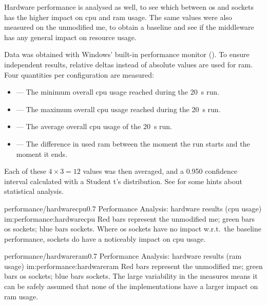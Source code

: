 

Hardware performance is analysed as well, to see which between \gls{os} and  sockets has the higher impact on \gls{cpu} and \gls{ram} usage. The same values were also measured on the unmodified \gls{me}, to obtain a baseline and see if the \gls{middleware} has any general impact on resource usage.

Data was obtained with Windows' built-in performance monitor (). To ensure independent results, relative deltas instead of absolute values are used for \gls{ram}. Four quantities per configuration are measured:

\begin{itemize}
	\item {} --- The minimum overall \gls{cpu} usage reached during the \SI{20}{\second} run.
	\item {} --- The maximum overall \gls{cpu} usage reached during the \SI{20}{\second} run.
	\item {} --- The average overall \gls{cpu} usage of the \SI{20}{\second} run.
	\item {} --- The difference in used \gls{ram} between the moment the run starts and the moment it ends.
\end{itemize}

\FLOATnoindent Each of these $4\times3=12$ values was then averaged, and a \num{0,950} confidence interval calculated with a Student t's distribution. See  for some hints about statistical analysis.

\begin{image}
	{performance/hardwarecpu}{0.7}
	{Performance Analysis: hardware results (\gls{cpu} usage)}
	{im:performance:hardwarecpu}
	{}
	{Red bars represent the unmodified \gls{me}; green bars \gls{os} sockets; blue bars  sockets. Where \gls{os} sockets have no impact w.r.t.\ the baseline performance,  sockets do have a noticeably impact on \gls{cpu} usage.}
\end{image}

\begin{image}
	{performance/hardwareram}{0.7}
	{Performance Analysis: hardware results (\gls{ram} usage)}
	{im:performance:hardwareram}
	{}
	{Red bars represent the unmodified \gls{me}; green bars \gls{os} sockets; blue bars  sockets. The large variability in the measures means it can be safely assumed that none of the implementations have a larger impact on \gls{ram} usage.}
\end{image}

